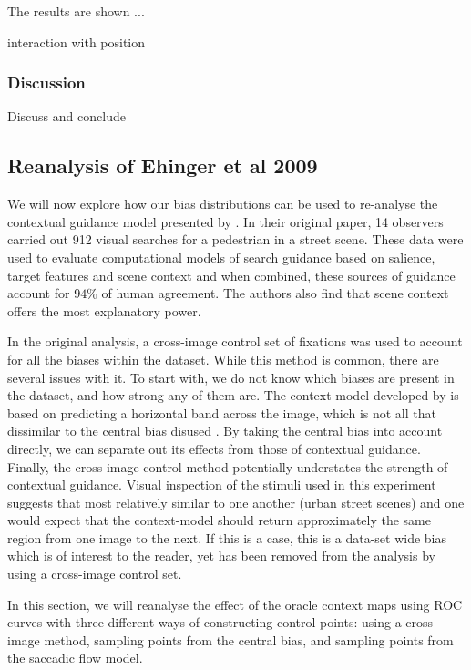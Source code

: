 \documentclass[a4paper, twocolumn, oneside, 10pt]{article}
\begin{document}
 The results are shown ...

interaction with position

\subsubsection{Discussion}

Discuss and conclude		

\subsection{Reanalysis of Ehinger et al 2009}

We will now explore how our bias distributions can be used to re-analyse the contextual guidance model presented by \cite{ehinger2009}. In their original paper, 14 observers carried out 912 visual searches for a pedestrian in a street scene. These data were used to evaluate computational models of search guidance based on salience, target features and scene context and when combined, these sources of guidance account for $94\%$ of human agreement. The authors also find that scene context offers the most explanatory power. 

In the original analysis, a cross-image control set of fixations was used to account for all the biases within the dataset. While this method is common, there are several issues with it. To start with, we do not know which biases are present in the dataset, and how strong any of them are. The context model developed by \cite{ehinger2009} is based on predicting a horizontal band across the image, which is not all that dissimilar to the central bias disused \cite{clarke-tatler2014}. By taking the central bias into account directly, we can separate out its effects from those of contextual guidance. Finally, the cross-image control method potentially understates the strength of contextual guidance. Visual inspection of the stimuli used in this experiment suggests that most relatively similar to one another (urban street scenes) and one would expect that the context-model should return approximately the same region from one image to the next. If this is a case, this is a data-set wide bias which is of interest to the reader, yet has been removed from the analysis by using a cross-image control set. 

In this section, we will reanalyse the effect of the oracle context maps using ROC curves with three different ways of constructing control points: using a cross-image method, sampling points from the central bias, and sampling points from the saccadic flow model. 
\end{document}
